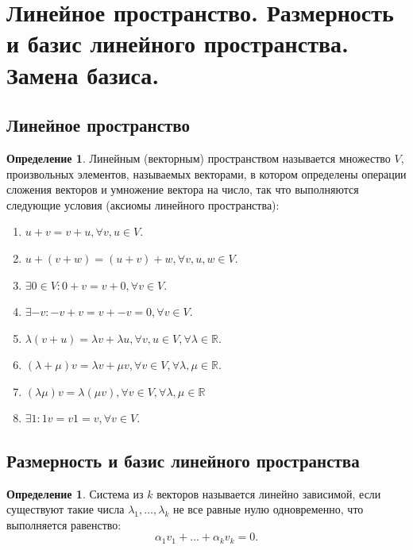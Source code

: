 \documentclass[12pt]{report}
\theoremstyle{definition}
\newtheorem{definition}[theorem]{Определение}
\newcommand{\R}{\mathbb R}
\begin{document}

\section
{
  Линейное пространство.
  Размерность и базис линейного пространства.
  Замена базиса.
}

\subsection{Линейное пространство}
\begin{definition}
Линейным (векторным) пространством называется множество $V$, произвольных элементов,
называемых векторами, в котором определены операции сложения векторов и умножение
вектора на число, так что выполняются следующие условия (аксиомы линейного пространства):

\begin{enumerate}
  \item $u + v = v + u, \forall v, u \in V$.
  \item $u + (v + w) = (u + v) + w, \forall v, u, w \in V$.
  \item $\exists 0 \in V: 0 + v = v + 0, \forall v \in V$.
  \item $\exists -v: -v + v = v + -v = 0, \forall v \in V$.
  \item $\lambda (v + u) = \lambda v + \lambda u, \forall v, u \in V, \forall \lambda \in \R$.
  \item $(\lambda + \mu) v = \lambda v + \mu v, \forall v \in V, \forall \lambda, \mu \in \R$.
  \item $(\lambda \mu) v = \lambda (\mu v), \forall v \in V, \forall \lambda, \mu \in \R$
  \item $\exists 1: 1 v = v 1 = v, \forall v \in V$.
\end{enumerate}
\end{definition}

\subsection{Размерность и базис линейного пространства}
\begin{definition}
Система из $k$ векторов называется линейно зависимой,
если существуют такие числа $\lambda_1, \dots, \lambda_k$ не все
равные нулю одновременно, что выполняется равенство:
$$
\alpha_1 v_1 + \dots + \alpha_k v_k = 0.
$$
\end{definition}
\end{document}
